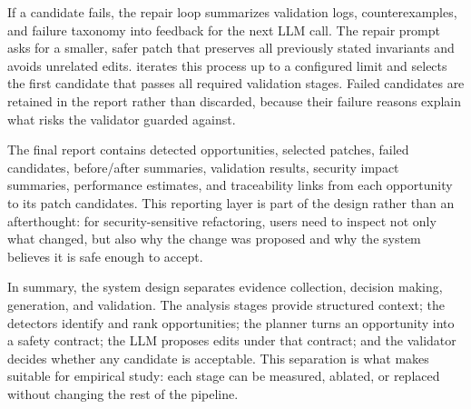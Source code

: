 If a candidate fails, the repair loop summarizes validation logs,
counterexamples, and failure taxonomy into feedback for the next LLM call. The
repair prompt asks for a smaller, safer patch that preserves all previously
stated invariants and avoids unrelated edits. \SysName{} iterates this process
up to a configured limit and selects the first candidate that passes all
required validation stages. Failed candidates are retained in the report rather
than discarded, because their failure reasons explain what risks the validator
guarded against.

The final report contains detected opportunities, selected patches, failed
candidates, before/after summaries, validation results, security impact
summaries, performance estimates, and traceability links from each opportunity
to its patch candidates. This reporting layer is part of the design rather than
an afterthought: for security-sensitive refactoring, users need to inspect not
only what changed, but also why the change was proposed and why the system
believes it is safe enough to accept.

In summary, the system design separates evidence collection, decision making,
generation, and validation. The analysis stages provide structured context; the
detectors identify and rank opportunities; the planner turns an opportunity into
a safety contract; the LLM proposes edits under that contract; and the validator
decides whether any candidate is acceptable. This separation is what makes
\SysName{} suitable for empirical study: each stage can be measured, ablated,
or replaced without changing the rest of the pipeline.
